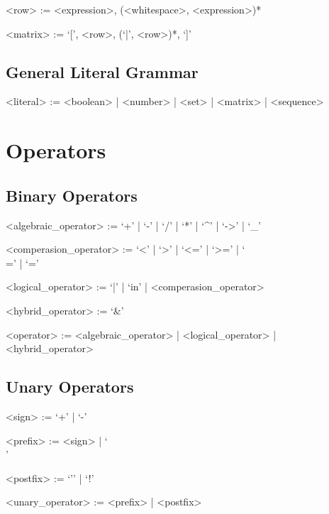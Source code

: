 \documentclass[11pt,a4paper]{book}
\begin{document}
\begin{grammar}
<row> := <expression>, (<whitespace>, <expression>)*

<matrix> := `[', <row>, (`|', <row>)*, `]'

\end{grammar}

\subsection{General Literal Grammar}

\begin{grammar}
<literal> := <boolean> | <number> | <set> | <matrix> | <sequence>
\end{grammar}

\section{Operators}

\subsection{Binary Operators}

\begin{grammar}

<algebraic\_operator> := `+' | `-' | `/' | `*' | `^' | `->' | `_' 

<comperasion\_operator> := `<' | `>' | `<=' | `>=' | `\\=' | `='

<logical\_operator> := `|' | `in' | <comperasion\_operator>

<hybrid\_operator> := `&'

<operator> := <algebraic\_operator> | <logical\_operator> | <hybrid\_operator>

\end{grammar}

\subsection{Unary Operators}

\begin{grammar}
<sign> := `+' | `-'

<prefix> := <sign> | `\\'

<postfix> := `'' | `!'

<unary\_operator> := <prefix> | <postfix>
\end{grammar}
\end{document}
